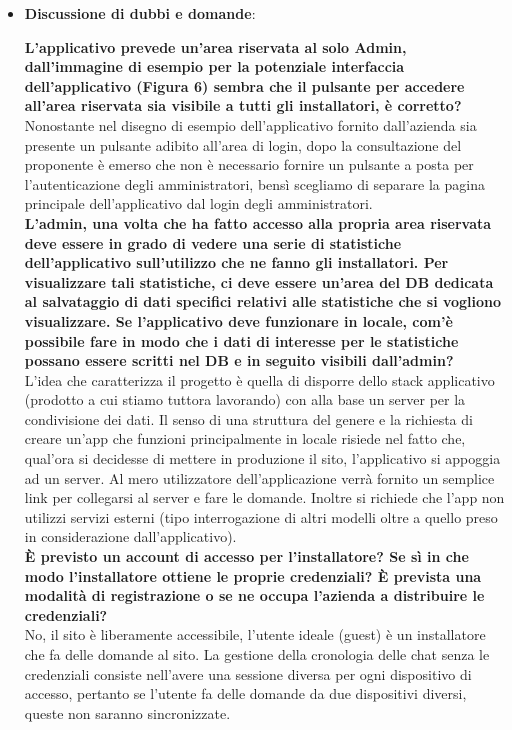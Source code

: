 \begin{itemize}
      \item \textbf{Discussione di dubbi e domande}:

      \textbf{L'applicativo prevede un'area riservata al solo Admin, dall'immagine di esempio per la potenziale interfaccia dell'applicativo (Figura 6) sembra che il pulsante per accedere all'area riservata sia visibile a tutti gli installatori, è corretto?}\\
      Nonostante nel disegno di esempio dell'applicativo fornito dall'azienda sia presente un pulsante adibito all'area di login, dopo la consultazione del proponente è emerso che non è necessario fornire un pulsante a posta per l'autenticazione degli amministratori, bensì scegliamo di separare la pagina principale dell'applicativo dal login degli amministratori.\\

      \textbf{L'admin, una volta che ha fatto accesso alla propria area riservata deve essere in grado di vedere una serie di statistiche dell'applicativo sull'utilizzo che ne fanno gli installatori. Per visualizzare tali statistiche, ci deve essere un'area del DB dedicata al salvataggio di dati specifici relativi alle statistiche che si vogliono visualizzare. Se l'applicativo deve funzionare in locale, com'è possibile fare in modo che i dati di interesse per le statistiche possano essere scritti nel DB e in seguito visibili dall'admin?}\\
      L'idea che caratterizza il progetto è quella di disporre dello stack applicativo (prodotto a cui stiamo tuttora lavorando) con alla base un server per la condivisione dei dati. Il senso di una struttura del genere e la richiesta di creare un'app che funzioni principalmente in locale risiede nel fatto che, qual'ora si decidesse di mettere in produzione il sito, l'applicativo si appoggia ad un server. Al mero utilizzatore dell'applicazione verrà fornito un semplice link per collegarsi al server e fare le domande. Inoltre si richiede che l'app non utilizzi servizi esterni (tipo interrogazione di altri modelli oltre a quello preso in considerazione dall'applicativo).\\

      \textbf{È previsto un account di accesso per l'installatore? Se sì in che modo l'installatore ottiene le proprie credenziali? È prevista una modalità di registrazione o se ne occupa l'azienda a distribuire le credenziali?}\\
      No, il sito è liberamente accessibile, l'utente ideale (guest) è un installatore che fa delle domande al sito. La gestione della cronologia delle chat senza le credenziali consiste nell'avere una sessione diversa per ogni dispositivo di accesso, pertanto se l'utente fa delle domande da due dispositivi diversi, queste non saranno sincronizzate.\\


\end{itemize}
